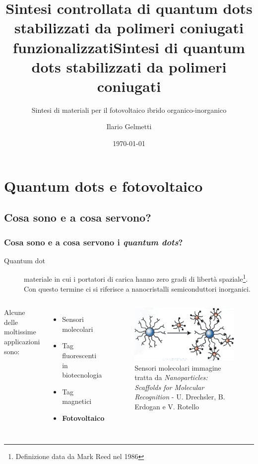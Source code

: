 \documentclass{beamer}
\title{Sintesi controllata di quantum dots stabilizzati da polimeri coniugati funzionalizzati}
\subtitle{Sintesi di materiali per il fotovoltaico ibrido organico-inorganico}
\author{Ilario Gelmetti}
\institute{Scuola Normale Superiore di Pisa}
\date{\today}
\begin{document}
\begin{frame}
  \titlepage
\end{frame}

\title{Sintesi di quantum dots stabilizzati da polimeri coniugati}





\begin{frame}
\setcounter{tocdepth}{1}
\tableofcontents
\end{frame}

\setcounter{tocdepth}{2}

\section{Quantum dots e fotovoltaico}\subsection{Cosa sono e a cosa servono?}
\begin{frame}
  \frametitle{
  Cosa sono e a cosa servono i \emph{quantum dots}?}
\begin{description}
\item [{Quantum dot}] materiale in cui i portatori di carica hanno zero gradi di libertà spaziale\footnote{Definizione data da Mark Reed nel 1986}. Con questo termine ci si riferisce a nanocristalli semiconduttori inorganici. 
\end{description}

\begin{columns}
	Alcune delle moltissime applicazioni sono:
	\begin{itemize}\item Sensori molecolari
	\item Tag fluorescenti in biotecnologia
	\item Tag magnetici
	\item \alert{\textbf{Fotovoltaico}}
\end{itemize}
\begin{figure}
\includegraphics[scale=0.25]{immagini/NPs_come_sensori.png}\caption{Sensori molecolari \tiny{immagine tratta da \emph{Nanoparticles: Scaffolds for Molecular Recognition} - U. Drechsler, B. Erdogan e V. Rotello}}
\end{figure}\end{columns}\end{frame}
\end{document}
